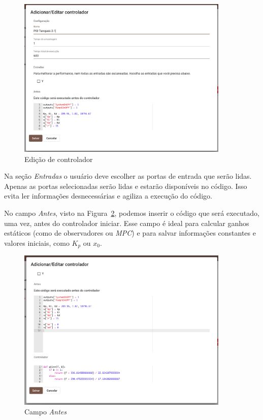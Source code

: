 \begin{figure}[ht!]
    \centering
    \includegraphics[width=0.9\textwidth]{imgs/control2}
    \caption[Edição de controlador]{Edição de controlador}%
    \label{fig:control2}
\end{figure}

Na seção \textit{Entradas} o usuário deve escolher as portas de entrada que
serão lidas. Apenas as portas selecionadas serão lidas e estarão disponíveis no
código. Isso evita ler informações desnecessárias e agiliza a execução do
código.

No campo \textit{Antes}, visto na Figura~\ref{fig:control3}, podemos inserir o
código que será executado, uma vez, antes do controlador iniciar. Esse campo é
ideal para calcular ganhos estáticos (como de observadores ou \textit{MPC}) e
para salvar informações constantes e valores iniciais, como \(K_p\) ou \(x_0\).

\begin{figure}[ht!]
    \centering
    \includegraphics[width=0.9\textwidth]{imgs/control3}
    \caption[Campo \textit{Antes}]{Campo \textit{Antes}}%
    \label{fig:control3}
\end{figure}

